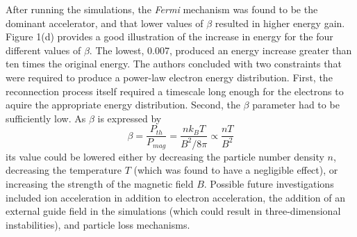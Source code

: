 \documentclass[12pt]{article}
\begin{document}
After running the simulations,
the \emph{Fermi} mechanism was found to be the dominant accelerator,
and that
lower values of
$\beta$ resulted in higher energy gain.
Figure 1(d) provides a good illustration of
the increase in energy for the four different
values of $\beta$. The lowest, 0.007, produced an energy
increase greater than ten times the original energy. 
The authors
concluded with two constraints that were required to produce
a power-law electron energy distribution.
First,
the reconnection process itself required a timescale
long enough for the electrons to aquire the appropriate energy
distribution.
Second, the $\beta$ parameter had to be sufficiently low.
As $\beta$ is expressed by
    $$ \beta = \frac{P_{th}}{P_{mag}} = \frac{nk_BT}{B^2/8\pi}
        \propto \frac{nT}{B^2}$$
its value could be lowered either by decreasing the particle number
density $n$, decreasing the temperature $T$ (which was found to have a
negligible effect),
or increasing the strength of the magnetic field $B$.
Possible future investigations included ion acceleration in
addition to electron acceleration,
the addition of an external guide field in the
simulations (which could result in three-dimensional instabilities),
and
particle loss mechanisms.
\end{document}
